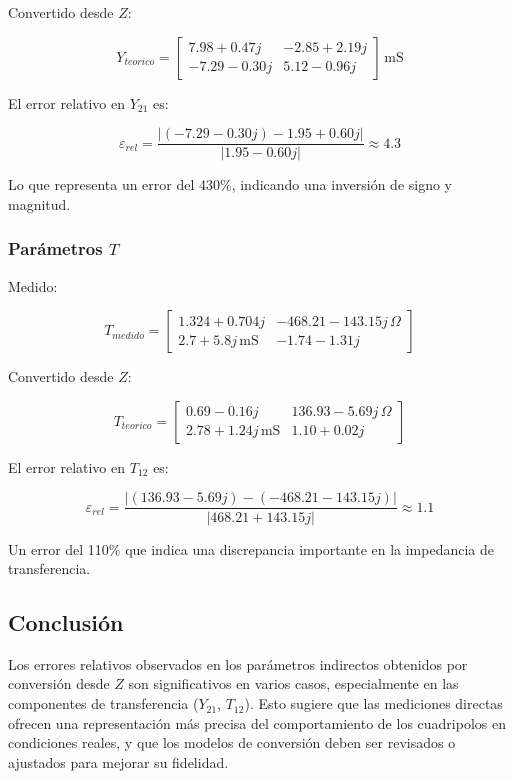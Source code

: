 Convertido desde $Z$:


\[
Y_{teorico} =
\begin{bmatrix}
7.98 + 0.47j & -2.85 + 2.19j \\
-7.29 - 0.30j & 5.12 - 0.96j
\end{bmatrix} \,\mathrm{mS}
\]



El error relativo en $Y_{21}$ es:



\[
\varepsilon_{rel} = \frac{|(-7.29 - 0.30j) - 1.95 + 0.60j|}{|1.95 - 0.60j|} \approx 4.3
\]



Lo que representa un error del 430\%, indicando una inversión de signo y magnitud.

\subsubsection*{Parámetros $T$}

Medido:


\[
T_{medido} =
\begin{bmatrix}
1.324 + 0.704j & -468.21 - 143.15j\,\Omega \\
2.7 + 5.8j\,\mathrm{mS} & -1.74 - 1.31j
\end{bmatrix}
\]



Convertido desde $Z$:


\[
T_{teorico} =
\begin{bmatrix}
0.69 - 0.16j & 136.93 - 5.69j\,\Omega \\
2.78 + 1.24j\,\mathrm{mS} & 1.10 + 0.02j
\end{bmatrix}
\]



El error relativo en $T_{12}$ es:



\[
\varepsilon_{rel} = \frac{|(136.93 - 5.69j) - (-468.21 - 143.15j)|}{|468.21 + 143.15j|} \approx 1.1
\]



Un error del 110\% que indica una discrepancia importante en la impedancia de transferencia.

\subsection*{Conclusión}

Los errores relativos observados en los parámetros indirectos obtenidos por conversión desde $Z$ son significativos en varios casos, especialmente en las componentes de transferencia ($Y_{21}$, $T_{12}$). Esto sugiere que las mediciones directas ofrecen una representación más precisa del comportamiento de los cuadripolos en condiciones reales, y que los modelos de conversión deben ser revisados o ajustados para mejorar su fidelidad.

